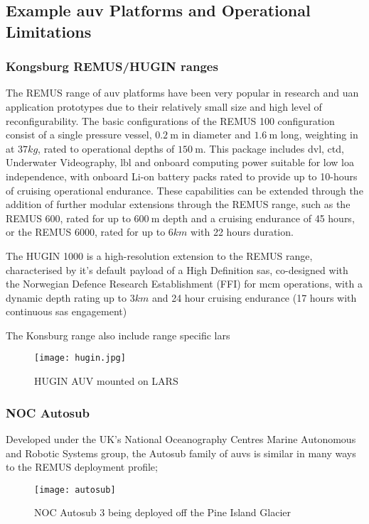 \subsection{Example \gls{auv} Platforms and Operational Limitations}

\subsubsection{Kongsburg REMUS/HUGIN ranges}

The REMUS range of \gls{auv} platforms have been very popular in research and \gls{uan} application prototypes due to their relatively small size and high level of reconfigurability.
The basic configurations of the REMUS 100 configuration consist of a single pressure vessel, $\SI{0.2}{\meter}$ in diameter and $\SI{1.6}{\meter}$ long, weighting in at $37kg$, rated to operational depths of $\SI{150}{\meter}$. 
This package includes \gls{dvl}, \gls{ctd}, Underwater Videography, \gls{lbl} and onboard computing power suitable for low \gls{loa} independence, with onboard Li-on battery packs rated to provide up to 10-hours of cruising operational endurance.
These capabilities can be extended through the addition of further modular extensions through the REMUS range, such as the REMUS 600, rated for up to $\SI{600}{\meter}$ depth and a cruising endurance of 45 hours, or the REMUS 6000, rated for up to $6km$ with 22 hours duration.

The HUGIN 1000 is a high-resolution extension to the REMUS range, characterised by it's default payload of a High Definition \gls{sas}, co-designed with the Norwegian Defence Research Establishment (FFI) for \gls{mcm} operations, with a dynamic depth rating up to $3km$ and 24 hour cruising endurance (17 hours with continuous \gls{sas} engagement)

The Konsburg range also include range specific \gls{lars}
\begin{figure}[h]
	\centering
	\texttt{[image: hugin.jpg]}
	\caption{\label{fig:hugin}HUGIN AUV mounted on LARS}
\end{figure}
\subsubsection{NOC Autosub}

Developed under the UK's National Oceanography Centres Marine Autonomous and Robotic Systems group, the Autosub family of \glspl{auv} is similar in many ways to the REMUS deployment profile; 
\begin{figure}[h]
	\centering
	\texttt{[image: autosub]}
	\caption{\label{fig:autosub}NOC Autosub 3 being deployed off the Pine Island Glacier}
\end{figure}
